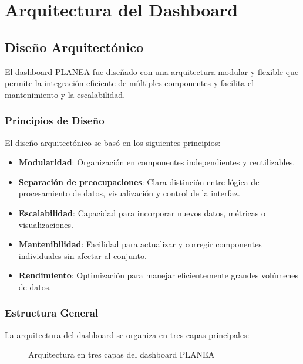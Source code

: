\chapter{Arquitectura del Dashboard}

\section{Diseño Arquitectónico}
El dashboard PLANEA fue diseñado con una arquitectura modular y flexible que permite la integración eficiente de múltiples componentes y facilita el mantenimiento y la escalabilidad.

\subsection{Principios de Diseño}
El diseño arquitectónico se basó en los siguientes principios:

\begin{itemize}
    \item \textbf{Modularidad}: Organización en componentes independientes y reutilizables.
    \item \textbf{Separación de preocupaciones}: Clara distinción entre lógica de procesamiento de datos, visualización y control de la interfaz.
    \item \textbf{Escalabilidad}: Capacidad para incorporar nuevos datos, métricas o visualizaciones.
    \item \textbf{Mantenibilidad}: Facilidad para actualizar y corregir componentes individuales sin afectar al conjunto.
    \item \textbf{Rendimiento}: Optimización para manejar eficientemente grandes volúmenes de datos.
\end{itemize}

\subsection{Estructura General}
La arquitectura del dashboard se organiza en tres capas principales:

\begin{figure}[h]
    \centering
    \caption{Arquitectura en tres capas del dashboard PLANEA}
    \label{fig:arquitectura}
\end{figure}

